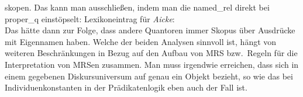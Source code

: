 skopen. Das kann man ausschließen, indem man die named\_rel direkt bei proper\_q einstöpselt:
\eas
Lexikoneintrag für \emph{Aicke}:\\
\zs
Das hätte dann zur Folge, dass andere Quantoren immer Skopus über Ausdrücke mit Eigennamen
haben. Welche der beiden Analysen sinnvoll ist, hängt von weiteren Beschränkungen in Bezug auf den
Aufbau von MRS bzw.\ Regeln für die Interpretation von MRSen zusammen. Man muss irgendwie erreichen, dass  sich
in einem gegebenen Diskursuniversum auf genau ein Objekt bezieht, so wie das bei
Individuenkonstanten in der Prädikatenlogik eben auch der Fall ist.

